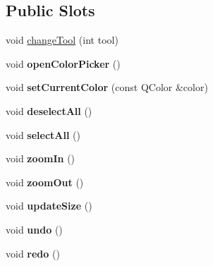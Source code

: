 \subsection*{Public Slots}
\begin{DoxyCompactItemize}
\item 
void \hyperlink{classCanvasWidget_a10d481976a36a4e489f42d2b5dfa4662}{change\-Tool} (int tool)
\item 
\hypertarget{classCanvasWidget_a24a75e8958b478656824d1d985d2d64d}{void {\bfseries open\-Color\-Picker} ()}\label{classCanvasWidget_a24a75e8958b478656824d1d985d2d64d}

\item 
\hypertarget{classCanvasWidget_a3dbc33d4382ea5295af8008760f123f3}{void {\bfseries set\-Current\-Color} (const Q\-Color \&color)}\label{classCanvasWidget_a3dbc33d4382ea5295af8008760f123f3}

\item 
\hypertarget{classCanvasWidget_a6a39b7120018202a7fc095a7638e8c90}{void {\bfseries deselect\-All} ()}\label{classCanvasWidget_a6a39b7120018202a7fc095a7638e8c90}

\item 
\hypertarget{classCanvasWidget_a692ef366f79d844dabc58803a82ba2d4}{void {\bfseries select\-All} ()}\label{classCanvasWidget_a692ef366f79d844dabc58803a82ba2d4}

\item 
\hypertarget{classCanvasWidget_afd4a461b8779e2d692a08647e655bc1e}{void {\bfseries zoom\-In} ()}\label{classCanvasWidget_afd4a461b8779e2d692a08647e655bc1e}

\item 
\hypertarget{classCanvasWidget_a0a19a82e3f4fbe354b779ff014e55ff2}{void {\bfseries zoom\-Out} ()}\label{classCanvasWidget_a0a19a82e3f4fbe354b779ff014e55ff2}

\item 
\hypertarget{classCanvasWidget_a05e567b5107bad5938e32a650c7696a6}{void {\bfseries update\-Size} ()}\label{classCanvasWidget_a05e567b5107bad5938e32a650c7696a6}

\item 
\hypertarget{classCanvasWidget_a9617418393fa64b4d662c0523acd98a2}{void {\bfseries undo} ()}\label{classCanvasWidget_a9617418393fa64b4d662c0523acd98a2}

\item 
\hypertarget{classCanvasWidget_ae6032a56c6be372d9b48fea14dcb1954}{void {\bfseries redo} ()}\label{classCanvasWidget_ae6032a56c6be372d9b48fea14dcb1954}


\end{DoxyCompactItemize}
